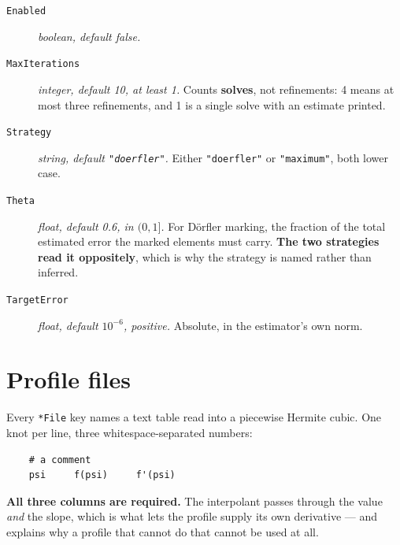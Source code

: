 \begin{description}

\item[\texttt{Enabled}] \emph{boolean, default false.}

\item[\texttt{MaxIterations}] \emph{integer, default 10, at least 1.} Counts
	\textbf{solves}, not refinements: 4 means at most three refinements, and 1
	is a single solve with an estimate printed.

\item[\texttt{Strategy}] \emph{string, default \texttt{"doerfler"}.} Either
	\texttt{"doerfler"} or \texttt{"maximum"}, both lower case.

\item[\texttt{Theta}] \emph{float, default 0.6, in $(0, 1]$.} For D\"orfler
	marking, the fraction of the total estimated error the marked elements must
	carry. \textbf{The two strategies read it oppositely}, which is why the
	strategy is named rather than inferred.

\item[\texttt{TargetError}] \emph{float, default $10^{-6}$, positive.} Absolute,
	in the estimator's own norm.

\end{description}

\section{Profile files}
\label{sec:profileformat}

Every \texttt{*File} key names a text table read into a piecewise Hermite cubic.
One knot per line, three whitespace-separated numbers:

\begin{verbatim}
    # a comment
    psi     f(psi)     f'(psi)
\end{verbatim}

\textbf{All three columns are required.} The interpolant passes through the
value \emph{and} the slope, which is what lets the profile supply its own
derivative --- and  explains why a profile that cannot do that
cannot be used at all.

